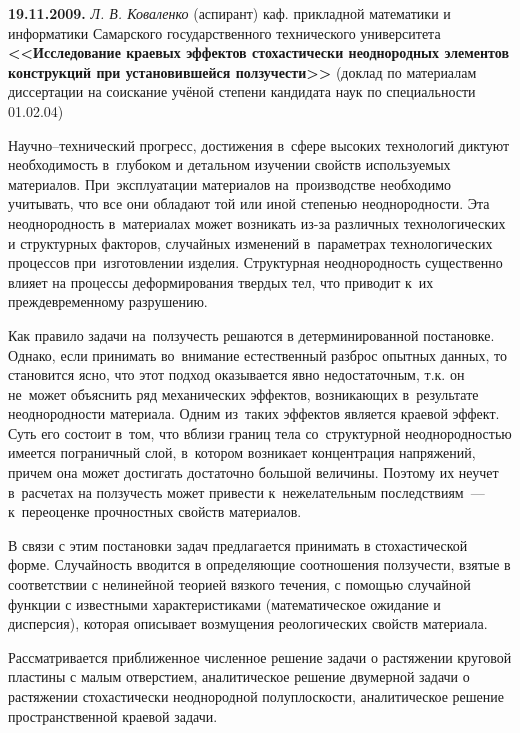 \bigskip

\noindent
{\bf 19.11.2009.} {\it Л. В. Коваленко} {\footnotesize (аспирант) каф. прикладной математики и информатики Самарского государственного технического университета} \\
{\bf <<Исследование краевых эффектов стохастически неоднородных элементов конструкций при установившейся ползучести>> } {\footnotesize (доклад по материалам диссертации  на соискание учёной степени кандидата наук по специальности 01.02.04)}

\smallskip

{
\small


Научно--технический прогресс, достижения в~сфере высоких технологий
диктуют необходимость в~глубоком и детальном изучении свойств
используемых материалов. При~экс\-плу\-а\-та\-ции материалов
на~производстве необходимо учитывать, что все они обладают той или
иной степенью не\-од\-но\-род\-нос\-ти. Эта неоднородность
в~материалах может возникать из-за раз\-лич\-ных
тех\-но\-ло\-ги\-чес\-ких и структурных факторов, случайных
изменений в~па\-ра\-мет\-рах технологических процессов
при~из\-го\-тов\-ле\-нии изделия. Структурная не\-од\-но\-род\-ность
существенно влияет на процессы де\-фор\-ми\-ро\-ва\-ния твердых тел,
что приводит к~их преждевременному разрушению.

Как правило задачи на~ползучесть решаются в детерминированной
пос\-та\-нов\-ке. Однако, если принимать во~внимание естественный
разброс опытных данных, то становится ясно, что этот подход
оказывается явно недостаточным, т.к. он не~может объяснить ряд
механических эффектов, воз\-ни\-ка\-ю\-щих в~ре\-зуль\-та\-те
неоднородности ма\-те\-ри\-а\-ла. Одним из~таких эффектов является
кра\-е\-вой эффект. Суть его состоит в~том, что вблизи границ тела
со~структурной неоднородностью имеется пограничный слой, в~котором
возникает кон\-цен\-тра\-ция напряжений, причем она может достигать
достаточно большой величины. Поэтому их неучет в~расчетах на
ползучесть может привести к~не\-же\-ла\-тель\-ным последствиям~---
к~пе\-ре\-о\-цен\-ке прочностных свойств материалов.

В связи с этим постановки задач предлагается принимать  в стохастической форме.
Случайность вводится в определяющие соотношения ползучести, взятые в
соответствии с нелинейной теорией вязкого течения, с помощью
случайной функции с известными характеристиками (математическое ожидание и дисперсия), которая описывает возмущения
реологических свойств материала.

Рассматривается приближенное численное решение задачи о растяжении круговой пластины
с малым отверстием, аналитическое решение двумерной задачи о растяжении стохастически неоднородной полуплоскости, аналитическое решение пространственной краевой задачи. 

}
